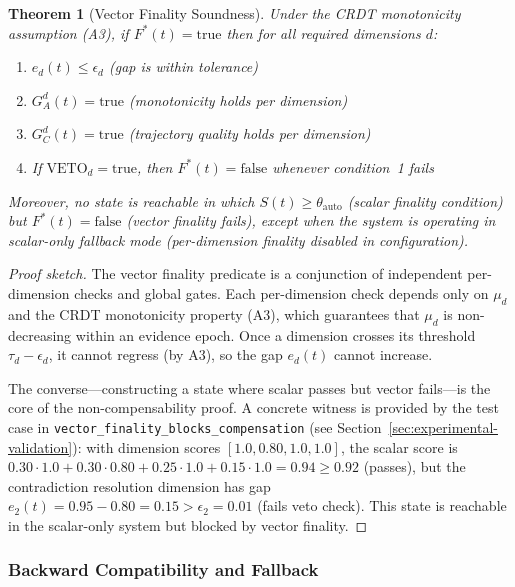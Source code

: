 \documentclass[11pt]{article}
\newtheorem{theorem}{Theorem}
\begin{document}
\begin{theorem}[Vector Finality Soundness]
\label{thm:vector-finality-soundness}
Under the CRDT monotonicity assumption (A3), if $F^*(t) = \text{true}$ then for all required
dimensions $d$:
\begin{enumerate}
  \item $e_d(t) \leq \epsilon_d$ (gap is within tolerance)
  \item $G_A^d(t) = \text{true}$ (monotonicity holds per dimension)
  \item $G_C^d(t) = \text{true}$ (trajectory quality holds per dimension)
  \item If $\text{VETO}_d = \text{true}$, then $F^*(t) = \text{false}$ whenever condition~1 fails
\end{enumerate}

Moreover, no state is reachable in which $S(t) \geq \theta_{\text{auto}}$ (scalar finality condition)
but $F^*(t) = \text{false}$ (vector finality fails), except when the system is operating in scalar-only
fallback mode (per-dimension finality disabled in configuration).
\end{theorem}

\begin{proof}[Proof sketch]
The vector finality predicate is a conjunction of independent per-dimension checks and global gates.
Each per-dimension check depends only on $\mu_d$ and the CRDT monotonicity property (A3), which guarantees
that $\mu_d$ is non-decreasing within an evidence epoch. Once a dimension crosses its threshold
$\tau_d - \epsilon_d$, it cannot regress (by A3), so the gap $e_d(t)$ cannot increase.

The converse---constructing a state where scalar passes but vector fails---is the core of the
non-compensability proof. A concrete witness is provided by the test case in
\texttt{vector\_finality\_blocks\_compensation} (see Section~\ref{sec:experimental-validation}):
with dimension scores $[1.0, 0.80, 1.0, 1.0]$, the scalar score is $0.30 \cdot 1.0 + 0.30 \cdot 0.80
+ 0.25 \cdot 1.0 + 0.15 \cdot 1.0 = 0.94 \geq 0.92$ (passes), but the contradiction resolution dimension
has gap $e_2(t) = 0.95 - 0.80 = 0.15 > \epsilon_2 = 0.01$ (fails veto check). This state is reachable
in the scalar-only system but blocked by vector finality.
\end{proof}

\subsubsection{Backward Compatibility and Fallback}
\end{document}
